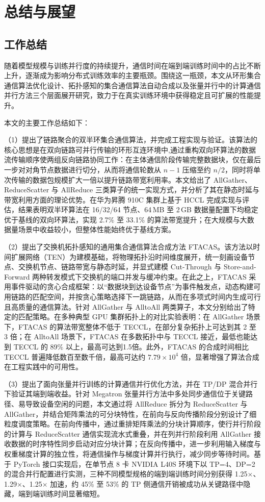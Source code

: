 \chapter{总结与展望}
\section{工作总结}

随着模型规模与训练并行度的持续提升，通信时间在端到端训练时间中的占比不断上升，逐渐成为影响分布式训练效率的主要瓶颈。围绕这一瓶颈，本文从环形集合通信算法优化设计、拓扑感知的集合通信算法自动合成以及张量并行中的计算通信并行方法三个层面展开研究，致力于在真实训练环境中获得稳定且可扩展的性能提升。

本文的主要工作总结如下：

（1）提出了链路聚合的双半环集合通信算法，并完成工程实现与验证。该算法的核心思想是在双向链路可并行传输的环形互连环境中,通过重构双向环算法的数据流传输顺序使两组反向链路协同工作：在主体通信阶段传输完整数据块，仅在最后一步对对角节点数据进行切分，从而将通信轮数从 $n-1$ 压缩至约 $n/2$，同时将单次传输的数据包规模扩大一倍以提升链路带宽利用率。本文给出了 AllGather、ReduceScatter 与 AllReduce 三类算子的统一实现方式，并分析了其在静态时延与带宽利用方面的理论优势。在华为昇腾 910C 集群上基于 HCCL 完成实现与评估，结果表明双半环算法在 16/32/64 节点、64\,MB 至 2\,GB 数据量配置下均稳定优于基线的双向环算法，实现 2.7\% 至 33.1\% 的算法带宽提升；在大规模与大数据量场景中收益较小，但整体性能始终优于基线方案。

（2）提出了交换机拓扑感知的通用集合通信算法合成方法 FTACAS。该方法以时间扩展网络（TEN）为建模基础，将物理拓扑沿时间维度展开，统一刻画设备节点、交换机节点、链路带宽与静态时延，并显式建模 Cut-Through 与 Store-and-Forward 两种转发模式下交换机的端口并发与缓冲约束。在此之上，FTACAS 采用事件驱动的贪心合成框架：以“数据块到达设备节点”为事件触发点，动态构建可用链路的匹配空间，并按贪心策略选择下一跳链路，从而在多项式时间内生成可行且高质量的通信算法。针对 AllGather 与 AlltoAll 两类算子，本文分别给出了特定的匹配策略。在多种典型 GPU 集群拓扑上的对比实验表明：在 AllGather 场景下，FTACAS 的算法带宽整体不低于 TECCL，在部分复杂拓扑上可达到其 2 至 3 倍；在 AlltoAll 场景下，FTACAS 在多数拓扑中与 TECCL 接近，最低也能达到 TECCL 的 89\% 以上，最高可达到1.5倍。此外，FTACAS 的合成时间相比 TECCL 普遍降低数百至数千倍，最高可达约 $7.79\times10^{4}$ 倍，显著增强了算法合成在工程实践中的可用性。

（3）提出了面向张量并行训练的计算通信并行优化方法，并在 TP/DP 混合并行下验证其端到端收益。针对 Megatron 张量并行方法中多处同步通信位于关键路径、易导致设备空闲的问题，本文通过将 AllReduce 拆分为 ReduceScatter 与 AllGather，并结合矩阵乘法的可分块特性，在前向与反向传播阶段分别设计了细粒度调度策略。在前向传播中，通过重排矩阵乘法的分块计算顺序，使行并行阶段的计算与 ReduceScatter 通信实现流水式重叠，并在列并行阶段利用 AllGather 接收数据的时序特性同步启动对应分块计算；在反向传播中，进一步利用输入梯度与权重梯度计算的独立性，将通信操作与梯度计算并行执行，减少同步等待时间。基于 PyTorch 接口实现后，在单节点 8 卡 NVIDIA L40S 环境下以 TP=4、DP=2 的混合并行配置进行实测，三种不同模型规格的端到端训练时间分别获得 1.25$\times$、1.29$\times$、1.25$\times$ 加速，约 45\% 至 53\% 的 TP 侧通信开销被成功从关键路径中隐藏，端到端训练时间显著缩短。



